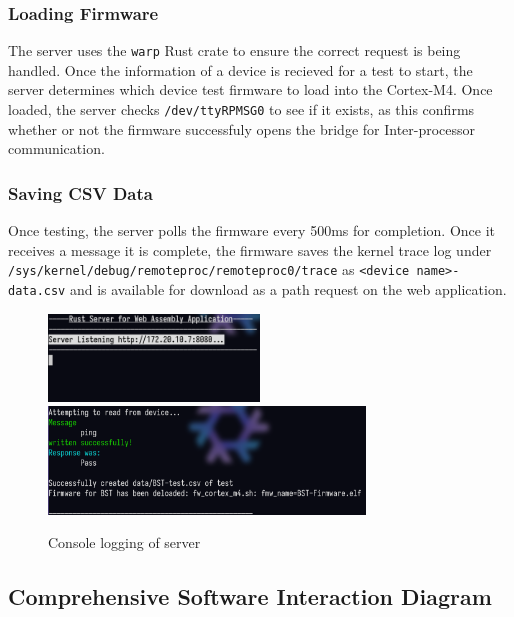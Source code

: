 \documentclass[12pt]{article}
\begin{document}
\subsubsection{Loading Firmware}
The server uses the \verb+warp+ Rust crate to ensure the correct request is being handled. 
Once the information of a device is recieved for a test to start, the server
determines which device test firmware to load into the Cortex-M4. Once loaded,
the server checks \verb+/dev/ttyRPMSG0+ to see if it exists, as this confirms whether or not 
the firmware successfuly opens the bridge for Inter-processor communication. 

\subsubsection{Saving CSV Data}
Once testing, the server polls the firmware every 500ms for completion. Once
it receives a message it is complete, the firmware saves the kernel trace log under
\verb+/sys/kernel/debug/remoteproc/remoteproc0/trace+ as \verb+<device name>-data.csv+ and
is available for download as a path request on the web application.

\begin{figure}[H]
  \centering
  \includegraphics[width=0.5\textwidth]{../assets/server1.png}
  \includegraphics[width=0.75\textwidth]{../assets/server2.png}
  \caption{Console logging of server}
\end{figure}

\subsection{Comprehensive Software Interaction Diagram}
\end{document}
